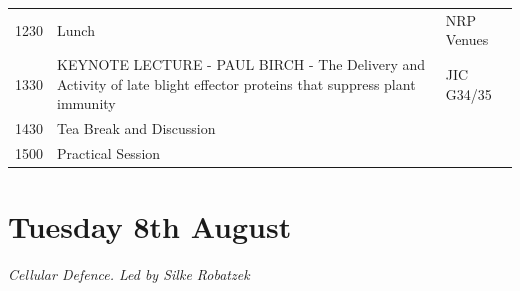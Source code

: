 \documentclass[12pt,]{book}
\theoremstyle{definition}
\theoremstyle{definition}
\theoremstyle{remark}
\begin{document}
\begin{longtable}[]{@{}lll@{}}
\begin{minipage}[t]{0.09\columnwidth}
1230\strut
\end{minipage} & \begin{minipage}[t]{0.39\columnwidth}\raggedright\strut
Lunch\strut
\end{minipage} & \begin{minipage}[t]{0.13\columnwidth}\raggedright\strut
NRP Venues\strut
\end{minipage}\tabularnewline
\begin{minipage}[t]{0.09\columnwidth}\raggedright\strut
1330\strut
\end{minipage} & \begin{minipage}[t]{0.39\columnwidth}\raggedright\strut
KEYNOTE LECTURE - PAUL BIRCH - The Delivery and Activity of late blight
effector proteins that suppress plant immunity\strut
\end{minipage} & \begin{minipage}[t]{0.13\columnwidth}\raggedright\strut
JIC G34/35\strut
\end{minipage}\tabularnewline
\begin{minipage}[t]{0.09\columnwidth}\raggedright\strut
1430\strut
\end{minipage} & \begin{minipage}[t]{0.39\columnwidth}\raggedright\strut
Tea Break and Discussion\strut
\end{minipage} & \begin{minipage}[t]{0.13\columnwidth}\raggedright\strut
\strut
\end{minipage}\tabularnewline
\begin{minipage}[t]{0.09\columnwidth}\raggedright\strut
1500\strut
\end{minipage} & \begin{minipage}[t]{0.39\columnwidth}\raggedright\strut
Practical Session\strut
\end{minipage} & \begin{minipage}[t]{0.13\columnwidth}\raggedright\strut
\strut
\end{minipage}\tabularnewline
\bottomrule
\end{longtable}

\section*{Tuesday 8th August}\label{tuesday-8th-august}

\emph{Cellular Defence. Led by Silke Robatzek}
\end{document}
